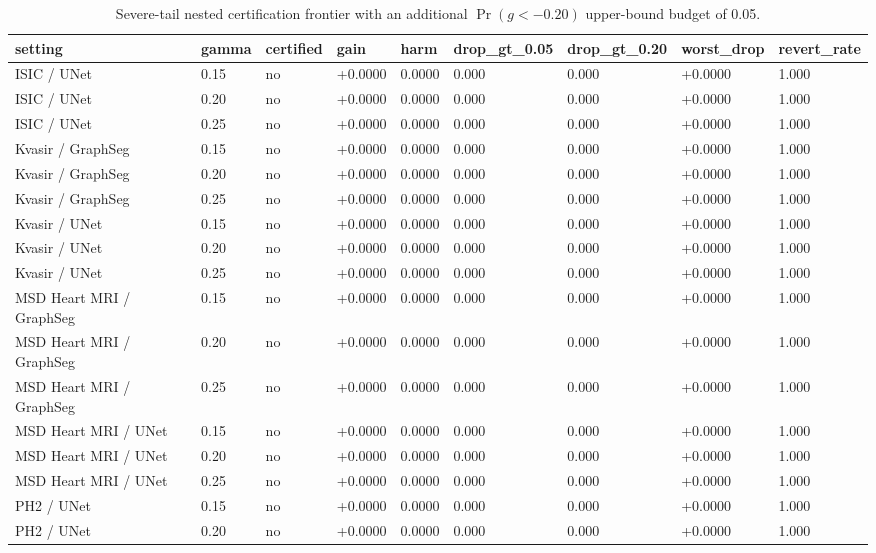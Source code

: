 \begin{table}[t]
\centering
\small
\caption{Severe-tail nested certification frontier with an additional $\Pr(g<-0.20)$ upper-bound budget of 0.05.}
\label{tab:nested_severe_certification_frontier_compact}
\begin{tabular}{lllllllll}
\toprule
setting & gamma & certified & gain & harm & drop\_gt\_0.05 & drop\_gt\_0.20 & worst\_drop & revert\_rate \\
\midrule
ISIC / UNet & 0.15 & no & +0.0000 & 0.0000 & 0.000 & 0.000 & +0.0000 & 1.000 \\
ISIC / UNet & 0.20 & no & +0.0000 & 0.0000 & 0.000 & 0.000 & +0.0000 & 1.000 \\
ISIC / UNet & 0.25 & no & +0.0000 & 0.0000 & 0.000 & 0.000 & +0.0000 & 1.000 \\
Kvasir / GraphSeg & 0.15 & no & +0.0000 & 0.0000 & 0.000 & 0.000 & +0.0000 & 1.000 \\
Kvasir / GraphSeg & 0.20 & no & +0.0000 & 0.0000 & 0.000 & 0.000 & +0.0000 & 1.000 \\
Kvasir / GraphSeg & 0.25 & no & +0.0000 & 0.0000 & 0.000 & 0.000 & +0.0000 & 1.000 \\
Kvasir / UNet & 0.15 & no & +0.0000 & 0.0000 & 0.000 & 0.000 & +0.0000 & 1.000 \\
Kvasir / UNet & 0.20 & no & +0.0000 & 0.0000 & 0.000 & 0.000 & +0.0000 & 1.000 \\
Kvasir / UNet & 0.25 & no & +0.0000 & 0.0000 & 0.000 & 0.000 & +0.0000 & 1.000 \\
MSD Heart MRI / GraphSeg & 0.15 & no & +0.0000 & 0.0000 & 0.000 & 0.000 & +0.0000 & 1.000 \\
MSD Heart MRI / GraphSeg & 0.20 & no & +0.0000 & 0.0000 & 0.000 & 0.000 & +0.0000 & 1.000 \\
MSD Heart MRI / GraphSeg & 0.25 & no & +0.0000 & 0.0000 & 0.000 & 0.000 & +0.0000 & 1.000 \\
MSD Heart MRI / UNet & 0.15 & no & +0.0000 & 0.0000 & 0.000 & 0.000 & +0.0000 & 1.000 \\
MSD Heart MRI / UNet & 0.20 & no & +0.0000 & 0.0000 & 0.000 & 0.000 & +0.0000 & 1.000 \\
MSD Heart MRI / UNet & 0.25 & no & +0.0000 & 0.0000 & 0.000 & 0.000 & +0.0000 & 1.000 \\
PH2 / UNet & 0.15 & no & +0.0000 & 0.0000 & 0.000 & 0.000 & +0.0000 & 1.000 \\
PH2 / UNet & 0.20 & no & +0.0000 & 0.0000 & 0.000 & 0.000 & +0.0000 & 1.000 \\

\end{tabular}
\end{table}
